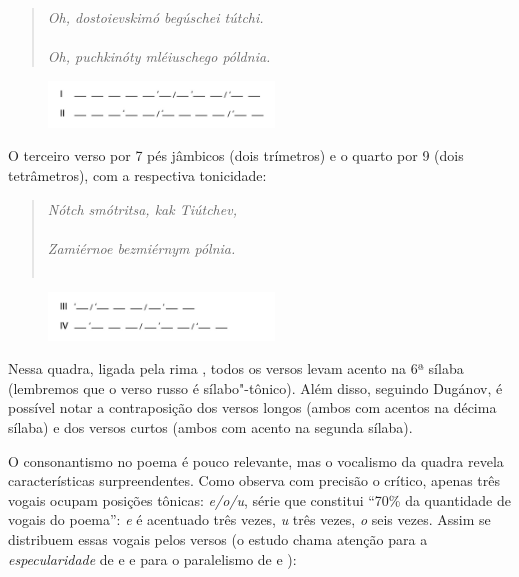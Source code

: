 \begin{verse}
\emph{Oh, dostoievskimó begúschei tútchi.} \\
{} \\[8pt]
\emph{Oh, puchkinóty mléiuschego póldnia.} \\
{}
\end{verse}

\begin{figure}[!ht]
  \includegraphics[width=60mm]{./imgs/grafico1.jpg}
 \end{figure}


O terceiro verso por 7 pés jâmbicos (dois trímetros) e o quarto por 9
(dois tetrâmetros), com a respectiva tonicidade:

\begin{verse}
\emph{Nótch smótritsa, kak Tiútchev,} \\
{} \\[8pt]
\emph{Zamiérnoe bezmiérnym pólnia.} \\
{} \\[8pt]
\end{verse}


\begin{figure}[!ht]
  \includegraphics[width=60mm]{./imgs/grafico2.jpg}
 \end{figure}

Nessa quadra, ligada pela rima , todos os versos levam acento na 6ª
sílaba (lembremos que o verso russo é sílabo"-tônico). Além disso,
seguindo Dugánov, é possível notar a contraposição dos versos longos
(ambos com acentos na décima sílaba) e dos versos curtos (ambos com
acento na segunda sílaba).

O consonantismo no poema é pouco relevante, mas o vocalismo da quadra revela características surpreendentes.
Como observa com precisão o crítico, apenas três vogais ocupam posições tônicas: \emph{e/o/u},
série que constitui ``70\% da quantidade de vogais do poema'': \emph{e} é acentuado três vezes, \emph{u}
três vezes, \emph{o} seis vezes. Assim se distribuem essas vogais pelos versos (o estudo chama atenção para a
\emph{especularidade} de  e  e para o paralelismo de  e ):

